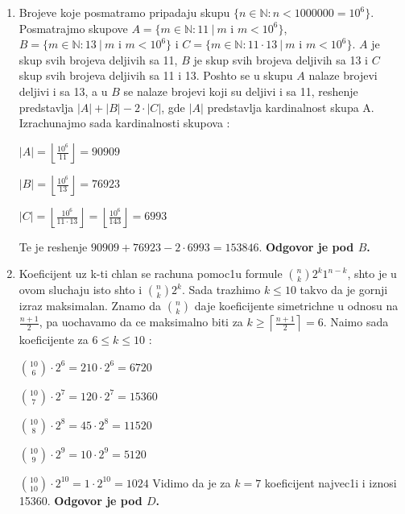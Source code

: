 \documentclass[a4paper,12pt]{article}
\begin{document}
\begin{enumerate}[1.]
\item Brojeve koje posmatramo pripadaju skupu $ \{n\in \mathbb{N} : n < 1 000 000 = 10^{6}\} $. Posmatrajmo skupove $A = \{ m \in \mathbb{N} : 11\ |\ m\mbox{\ i\ } m < 10^{6}\}$, $B = \{ m \in \mathbb{N} : 13\ |\ m\mbox{\ i\ } m < 10^{6}\}$ i $C = \{ m \in \mathbb{N} : 11 \cdot 13\ |\ m\mbox{\ i \ } m < 10^{6}\}$. $A$ je skup svih brojeva deljivih sa 11, $B$ je skup svih brojeva deljivih sa 13 i $C$ skup svih brojeva deljivih sa 11 i 13. Poshto se u skupu $A$ nalaze brojevi deljivi i sa 13, a u $B$ se nalaze brojevi koji su deljivi i sa 11, reshenje predstavlja $\lvert A \rvert + \lvert B \rvert  - 2 \cdot \lvert C \rvert $, gde $ \lvert A \rvert $ predstavlja kardinalnost skupa A. Izrachunajmo sada kardinalnosti skupova :
\par $ \lvert A \rvert = \left\lfloor \frac{10^{6}}{11}\right\rfloor   = 90909$  
\par  $ \lvert B \rvert = \left\lfloor \frac{10^{6}}{13}\right\rfloor   = 76923$
\par  $ \lvert C \rvert = \left\lfloor \frac{10^{6}}{11 \cdot 13}\right\rfloor = \left\lfloor \frac{10^{6}}{143}\right\rfloor  = 6993$  
\par Te je reshenje $ 90909 + 76923 - 2 \cdot 6993  = 153846$. \textbf{Odgovor je pod $B$.}

\item Koeficijent uz k-ti chlan se rachuna pomoc1u formule $\binom{n}{k}2^k1^{n-k}$, shto je u ovom sluchaju isto shto i $\binom{n}{k}2^{k} $. Sada trazhimo $ k \leq 10$ takvo da je gornji izraz maksimalan. Znamo da $\binom{n}{k}$ daje koeficijente simetrichne u odnosu na $\frac{n + 1}{2} $, pa uochavamo da ce maksimalno biti za $ k \geq \left\lceil \frac{n + 1}{2}\right\rceil   = 6$. Na\dj{}imo sada koeficijente za $ 6 \leq k \leq 10$ : 
\par $\binom{10}{6}\cdot 2^{6} = 210 \cdot 2^{6} = 6720 $
\par $\binom{10}{7}\cdot 2^{7} = 120 \cdot 2^{7} = 15360 $
\par $\binom{10}{8}\cdot 2^{8} = 45 \cdot 2^{8} =  11520$
\par $\binom{10}{9}\cdot 2^{9} = 10 \cdot 2^{9} = 5120 $
\par $\binom{10}{10}\cdot 2^{10} = 1 \cdot 2^{10} = 1024 $
Vidimo da je za $k = 7$ koeficijent najvec1i i iznosi 15360. \textbf{Odgovor je pod $D$.}


\end{enumerate}
\end{document}
